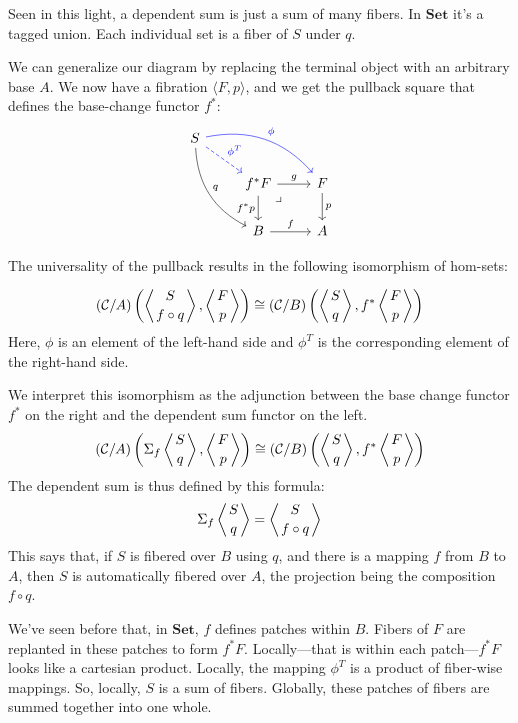 \documentclass[DaoFP]{subfiles}
\begin{document}
Seen in this light, a dependent sum is just a sum of many fibers. In $\mathbf{Set}$ it's a tagged union. Each individual set is a fiber of $S$ under $q$. 

We can generalize our diagram by replacing the terminal object with an arbitrary base $A$. We now have a fibration $\langle F, p \rangle$, and we get the pullback square that defines the base-change functor $f^*$:
\[
 \begin{tikzcd}
 S
 \arrow[dr, blue, dashed, "\phi^T"]
 \arrow[drr, blue, bend left, "\phi"]
 \arrow[ddr, bend right, "q"]
 \\
 &f^* F
\arrow[dr, phantom,  , very near start, "\lrcorner"]
 \arrow[r, "g"]
 \arrow[d, "f^* p"']
 &F
 \arrow[d, "p"]
 \\
 &B
 \arrow[r, "f"]
 &A
  \end{tikzcd}
\]

The universality of the pullback results in the following isomorphism of hom-sets:

\[ (\mathcal{C}/A) \left( \left \langle {S \atop f \circ q } \right \rangle , \left \langle {F \atop p} \right \rangle \right)  \cong   (\mathcal{C}/B) \left( \left \langle {S \atop q} \right \rangle , f^* \left \langle {F \atop p} \right \rangle \right)\]
Here, $\phi$ is an element of the left-hand side and $\phi^T$ is the corresponding element of the right-hand side. 

We interpret this isomorphism as the adjunction between the base change functor $f^*$ on the right and the dependent sum functor on the left. 
\[ (\mathcal{C}/A) \left( \Sigma_f \left \langle {S \atop q} \right \rangle , \left \langle {F \atop p} \right \rangle \right)  \cong   (\mathcal{C}/B) \left( \left \langle {S \atop q} \right \rangle , f^* \left \langle {F \atop p} \right \rangle \right)\]
The dependent sum is thus defined by this formula:
\[ \Sigma_f \left \langle {S \atop q} \right \rangle =  \left \langle {S \atop f \circ q} \right \rangle \]
This says that, if $S$ is fibered over $B$ using $q$, and there is a mapping $f$ from $B$ to $A$, then $S$ is automatically fibered over $A$, the projection being the composition $f \circ q$. 

We've seen before that, in $\mathbf{Set}$, $f$ defines patches within $B$. Fibers of $F$ are replanted in these patches to form $f^*F$.  Locally---that is within each patch---$f^*F$ looks like a cartesian product. Locally, the mapping $\phi^T$ is a product of fiber-wise mappings. So, locally, $S$ is a sum of fibers. Globally, these patches of fibers are summed together into one whole.
\end{document}

